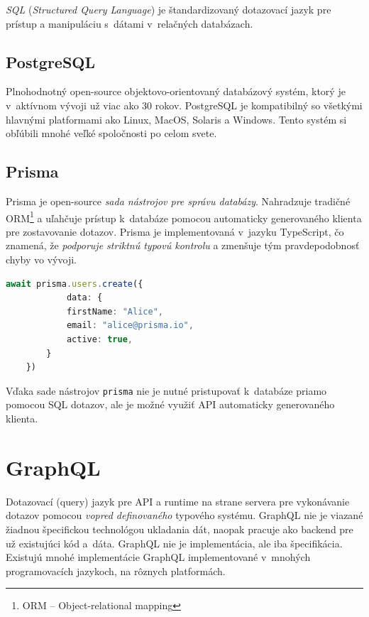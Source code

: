 \noindent \emph{SQL} (\emph{Structured Query Language}) je štandardizovaný dotazovací jazyk pre prístup a manipuláciu s~dátami v~relačných databázach.

\subsection{PostgreSQL}
Plnohodnotný open-source objektovo-orientovaný databázový systém, ktorý je v~aktívnom vývoji už viac ako 30 rokov. PostgreSQL je kompatibilný so všetkými hlavnými platformami ako Linux, MacOS, Solaris a Windows. Tento systém si obľúbili mnohé veľké spoločnosti po celom svete. \cite{PostgreSQL}

\subsection{Prisma}
Prisma je open-source \emph{sada nástrojov pre správu databázy}. Nahradzuje tradičné ORM\footnote{ORM -- Object-relational mapping} a uľahčuje prístup k~databáze pomocou automaticky generovaného klienta pre zostavovanie dotazov. Prisma je implementovaná v~jazyku TypeScript, čo znamená, že \emph{podporuje striktnú typovú kontrolu} a zmenšuje tým pravdepodobnosť chyby vo vývoji. \cite{Prisma} \\

\begin{lstlisting}[language=TypeScript, caption=Príklad tvorby užívateľa pomocou nástroja Prisma. \cite{Prisma}]
	await prisma.users.create({
			data: {
			firstName: "Alice",
			email: "alice@prisma.io",
			active: true,
		}
	})
\end{lstlisting}

\noindent Vďaka sade nástrojov \texttt{prisma} nie je nutné pristupovať k~databáze priamo pomocou SQL dotazov, ale je možné využiť API automaticky generovaného klienta.

\section{GraphQL}
\label{theory:graphql}
Dotazovací (query) jazyk pre API a runtime na strane servera pre vykonávanie dotazov pomocou \emph{vopred definovaného} typového systému. GraphQL nie je viazané žiadnou špecifickou technológou ukladania dát, naopak pracuje ako backend pre už existujúci kód a~dáta. \cite{GraphQL} GraphQL nie je implementácia, ale iba špecifikácia. Existujú mnohé implementácie GraphQL implementované v~mnohých programovacích jazykoch, na rôznych platformách. \\

